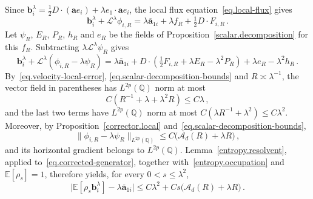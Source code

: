 \documentclass[11pt]{amsart}
\theoremstyle{definition}
\theoremstyle{remark}
\numberwithin{equation}{section}
\newcommand{\E}{\mathbb E}
\newcommand{\Q}{\mathbb Q}
\renewcommand{\a}{\mathbf a}
\renewcommand{\b}{\mathbf b}
\newcommand{\ahom}{\overline{\mathbf a}}
\newcommand{\cA}{\mathcal A}
\begin{document}
Since $\b_i^\lambda=\frac12D\cdot(\a e_i)+\lambda e_1\cdot\a e_i$, the local flux equation~\eqref{eq.local-flux} gives
\begin{equation*}
 \b_i^\lambda+\mathcal L^\lambda\phi_{i,R}
 =\lambda\ahom_{1i}+\lambda f_R+\tfrac12D\cdot F_{i,R}\, .
\end{equation*}
Let $\psi_R$, $E_R$, $P_R$, $h_R$ and $e_R$ be the fields of Proposition~\ref{scalar.decomposition} for this $f_R$. Subtracting $\lambda\mathcal L^\lambda\psi_R$ gives
\begin{equation}\label{eq.corrected-generator}
 \b_i^\lambda+\mathcal L^\lambda(\phi_{i,R}-\lambda\psi_R)
 =\lambda\ahom_{1i}
 +D\cdot\left(\tfrac12F_{i,R}+\lambda E_R-\lambda^2P_R\right)
 +\lambda e_R-\lambda^2h_R\, .
\end{equation}
By~\eqref{eq.velocity-local-error}, \eqref{eq.scalar-decomposition-bounds} and $R\asymp\lambda^{-1}$, the vector field in parentheses has $L^{2p}(\Q)$ norm at most
\begin{equation*}
 C(R^{-1}+\lambda+\lambda^2R)\leq C\lambda\, ,
\end{equation*}
and the last two terms have $L^{2p}(\Q)$ norm at most $C(\lambda R^{-1}+\lambda^2)\leq C\lambda^2$. Moreover, by Proposition~\ref{corrector.local} and~\eqref{eq.scalar-decomposition-bounds},
\begin{equation*}
 \|\phi_{i,R}-\lambda\psi_R\|_{L^{2p}(\Q)}
 \leq C\big(\cA_d(R)+\lambda R\big)\, ,
\end{equation*}
and its horizontal gradient belongs to $L^{2p}(\Q)$. Lemma~\ref{entropy.resolvent}, applied to~\eqref{eq.corrected-generator}, together with~\eqref{entropy.occupation} and $\E[\rho_s]=1$, therefore yields, for every $0<s\leq\lambda^2$,
\begin{equation}\label{eq.velocity-resolvent-rate}
 \big|\E[\rho_s\b_i^\lambda]-\lambda\ahom_{1i}\big|
 \leq C\lambda^2
 +Cs\big(\cA_d(R)+\lambda R\big)\, .
\end{equation}
\end{document}
